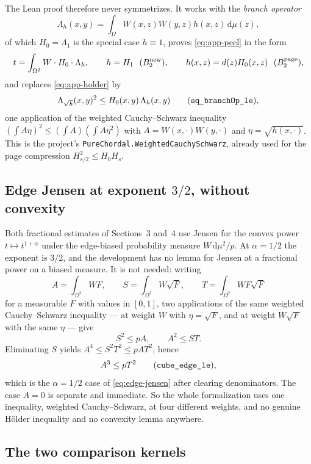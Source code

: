 \documentclass[11pt]{article}
\newcommand{\dd}{\,\mathrm d}
\begin{document}
The Lean proof therefore never symmetrizes.  It works with the
\emph{branch operator}
\[
 \Lambda_h(x,y)=\int_\Omega W(x,z)W(y,z)h(x,z)\dd\mu(z),
\]
of which $H_0=\Lambda_1$ is the special case $h\equiv1$, proves
\eqref{eq:app-peel} in the form
\[
 t=\int_{\Omega^2}W\cdot H_0\cdot\Lambda_h,
 \qquad
 h=H_1\ \ (B_2^{\rm new}),
 \qquad
 h(x,z)=d(z)H_0(x,z)\ \ (B_2^{\rm page}),
\]
and replaces \eqref{eq:app-holder} by
\[
 \Lambda_{\sqrt h}(x,y)^2\leq H_0(x,y)\,\Lambda_h(x,y)
 \qquad\text{(\texttt{sq\_branchOp\_le}),}
\]
one application of the weighted Cauchy--Schwarz inequality
$(\int A\eta)^2\leq(\int A)(\int A\eta^2)$ with $A=W(x,\cdot)W(y,\cdot)$ and
$\eta=\sqrt{h(x,\cdot)}$.  This is the project's
\texttt{PureChordal.WeightedCauchySchwarz}, already used for the page
compression $H_{s/2}^2\leq H_0H_s$.


\subsection{Edge Jensen at exponent $3/2$, without convexity}
\label{sec:app-jensen}

Both fractional estimates of Sections~3 and~4 use Jensen for the convex power
$t\mapsto t^{1+\alpha}$ under the edge-biased probability measure
$W\dd\mu^2/p$.  At $\alpha=1/2$ the exponent is $3/2$, and the development has
no lemma for Jensen at a fractional power on a biased measure.  It is not
needed: writing
\[
 A=\int_{\Omega^2}WF,
 \qquad
 S=\int_{\Omega^2}W\sqrt F,
 \qquad
 T=\int_{\Omega^2}WF\sqrt F
\]
for a measurable $F$ with values in $[0,1]$, two applications of the same
weighted Cauchy--Schwarz inequality --- at weight $W$ with $\eta=\sqrt F$, and
at weight $W\sqrt F$ with the same $\eta$ --- give
\[
 S^2\leq pA,
 \qquad
 A^2\leq ST.
\]
Eliminating $S$ yields $A^4\leq S^2T^2\leq pAT^2$, hence
\begin{equation}
 A^3\leq pT^2
 \qquad\text{(\texttt{cube\_edge\_le}),}
 \label{eq:app-cube}
\end{equation}
which is the $\alpha=1/2$ case of \eqref{eq:edge-jensen} after clearing
denominators.  The case $A=0$ is separate and immediate.  So the whole
formalization uses one inequality, weighted Cauchy--Schwarz, at four different
weights, and no genuine H\"older inequality and no convexity lemma anywhere.


\subsection{The two comparison kernels}
\label{sec:app-kernels}
\end{document}

